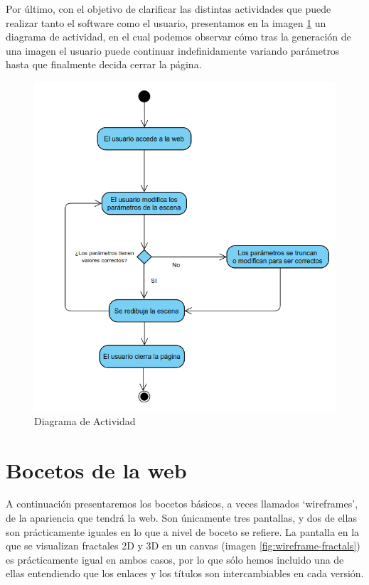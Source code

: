 Por último, con el objetivo de clarificar las distintas actividades que puede realizar tanto el software como el usuario, presentamos en la imagen \ref{fig:diagrama-actividad} un diagrama de actividad, en el cual podemos observar cómo tras la generación de una imagen el usuario puede continuar indefinidamente variando parámetros hasta que finalmente decida cerrar la página.

\begin{figure} [ht]
    \centering
    \includegraphics[width=12cm]{img/diagrama-actividad.png}
    \caption{Diagrama de Actividad}
        \label{fig:diagrama-actividad}
    \end{figure}

\newpage
\section{Bocetos de la web}

A continuación presentaremos los bocetos básicos, a veces llamados `wireframes', de la apariencia que tendrá la web. Son únicamente tres pantallas, y dos de ellas son prácticamente iguales en lo que a nivel de boceto se refiere. La pantalla en la que se visualizan fractales 2D y 3D en un canvas (imagen \ref{fig:wireframe-fractals}) es prácticamente igual en ambos casos, por lo que sólo hemos incluido una de ellas entendiendo que los enlaces y los títulos son intercambiables en cada versión. 


